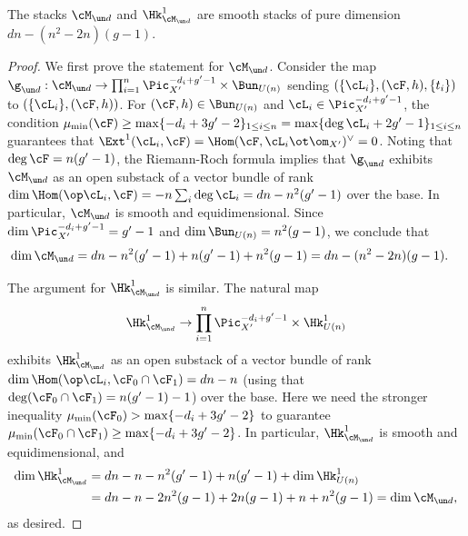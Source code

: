 \begin{lemma}
\notready\label{l:low deg M sm} The stacks $\cM_{\un d}$ and $\Hk^{1}_{\cM_{\un d}}$ are smooth stacks of pure dimension $dn - (n^2-2n)(g-1)$.
\end{lemma}
\begin{proof}
We first prove the statement for $\cM_{\un d}$.
Consider the map $\g_{\un d}: \cM_{\un d}\to \prod_{i=1}^{n}\Pic^{-d_{i}+g'-1}_{X'}\times \Bun_{U(n)}$ sending $(\{\cL_{i}\},(\cF,h),\{t_i\})$ to $(\{\cL_{i}\},(\cF,h))$.  For $(\cF,h)\in \Bun_{U(n)}$ and $\cL_{i}\in \Pic^{-d_{i}+g'-1}_{X'}$, the condition $\mu_{\min}(\cF)\ge\max\{-d_{i}+3g'-2\}_{1\le i\le n}=\max\{\deg\cL_{i}+2g'-1\}_{1\le i\le n}$ guarantees that $\Ext^{1}(\cL_{i}, \cF)=\Hom(\cF,\cL_{i}\ot\om_{X'})^{\vee}=0$. Noting that $\deg \cF = n(g'-1)$, the Riemann-Roch formula implies that $\g_{\un d}$ exhibits $\cM_{\un d}$ as an open substack of a vector bundle of rank $\dim\Hom(\op\cL_{i}, \cF)=-n\sum_{i}\deg\cL_{i}=dn-n^{2}(g'-1)$ over the base. In particular, $\cM_{\un d}$ is smooth and equidimensional. Since $\dim \Pic^{-d_{i}+g'-1}_{X'}=g'-1$ and $\dim \Bun_{U(n)}=n^{2}(g-1)$, we conclude that
\begin{align*}
\dim\cM_{\un d} & =dn-n^{2}(g'-1) + n (g'-1) + n^{2}(g-1) = dn- (n^2-2n)(g-1).
\end{align*}

The argument for $\Hk^{1}_{\cM_{\un d}}$ is similar. The natural map
$$
\Hk^{1}_{\cM_{\un d}}\to \prod_{i=1}^{n}\Pic^{-d_{i}+g'-1}_{X'}\times\Hk^{1}_{U(n)}
$$
exhibits $\Hk^{1}_{\cM_{\un d}}$ as an open substack of a vector bundle of rank $\dim\Hom(\op\cL_{i}, \cF_{0}\cap \cF_{1})=dn-n$ (using that $\deg(\cF_{0}\cap\cF_{1})=n(g'-1)-1$) over the base. Here we need the stronger inequality $\mu_{\min}(\cF_{0})>\max\{-d_{i}+3g'-2\}$ to guarantee $\mu_{\min}(\cF_{0}\cap\cF_{1})\ge\max\{-d_{i}+3g'-2\}$. In particular, $\Hk^{1}_{\cM_{\un d}}$ is smooth and equidimensional, and
\begin{align*}
\dim \Hk^{1}_{\cM_{\un d}} & =dn-n -n^{2}(g'-1)+ n(g'-1)+\dim \Hk^{1}_{U(n)}  \\
&= dn-n -2n^{2}(g-1)+ 2n(g-1) + n + n^2(g-1) =\dim\cM_{\un d},
\end{align*}
as desired.
\end{proof}

